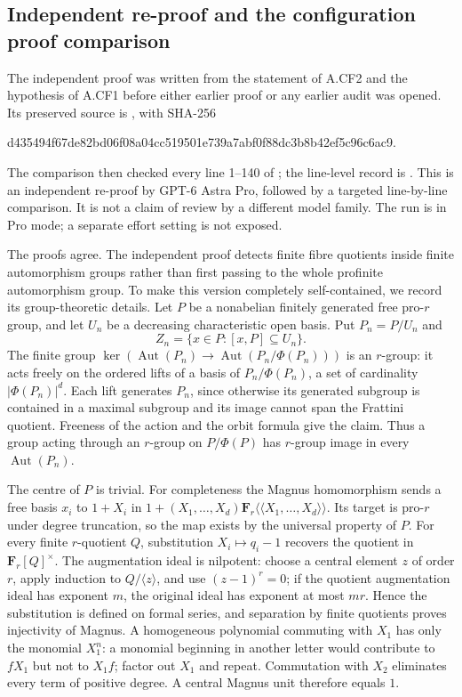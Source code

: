 \subsection{Independent re-proof and the configuration proof comparison}

The independent proof was written from the statement of A.CF2 and the
hypothesis of A.CF1 before either earlier proof or any earlier audit was
opened. Its preserved source is ,
with SHA-256
\begin{center}\footnotesize\ttfamily
d435494f67de82bd06f08a04cc519501e739a7abf0f88dc3b8b42ef5c96c6ac9.
\end{center}
The comparison then checked every line 1--140 of
; the
line-level record is .
This is an independent re-proof by GPT-6 Astra Pro, followed by a
targeted line-by-line comparison. It is not a claim of review by a
different model family. The run is in Pro mode; a separate effort
setting is not exposed.

The proofs agree. The independent proof detects finite fibre quotients
inside finite automorphism groups rather than first passing to the
whole profinite automorphism group. To make this version completely
self-contained, we record its group-theoretic details.
Let $P$ be a nonabelian finitely generated free pro-$r$ group, and let
$U_n$ be a decreasing characteristic open basis. Put $P_n=P/U_n$ and
\[
 Z_n=\{x\in P:[x,P]\subseteq U_n\}.
\]
The finite group
$\ker(\operatorname{Aut}(P_n)\to\operatorname{Aut}(P_n/\Phi(P_n)))$
is an $r$-group: it acts freely on the ordered lifts of a basis of
$P_n/\Phi(P_n)$, a set of cardinality $|\Phi(P_n)|^d$.
Each lift generates $P_n$, since otherwise its generated subgroup is
contained in a maximal subgroup and its image cannot span the
Frattini quotient. Freeness of the action and the orbit formula give
the claim. Thus a group acting through an $r$-group on $P/\Phi(P)$
has $r$-group image in every $\operatorname{Aut}(P_n)$.

The centre of $P$ is trivial. For completeness the Magnus homomorphism
sends a free basis $x_i$ to $1+X_i$ in
$1+(X_1,\ldots,X_d)\mathbf F_r\langle\!\langle X_1,\ldots,X_d\rangle\!\rangle$.
Its target is pro-$r$ under degree truncation, so the map exists by
the universal property of $P$. For every finite $r$-quotient $Q$,
substitution $X_i\mapsto q_i-1$ recovers the quotient in
$\mathbf F_r[Q]^\times$. The augmentation ideal is nilpotent:
choose a central element $z$ of order $r$, apply induction to
$Q/\langle z\rangle$, and use $(z-1)^r=0$; if the quotient
augmentation ideal has exponent $m$, the original ideal has exponent
at most $mr$. Hence the substitution is defined on formal series,
and separation by finite quotients proves injectivity of Magnus.
A homogeneous polynomial commuting with $X_1$ has only the monomial
$X_1^n$: a monomial beginning in another letter would contribute to
$fX_1$ but not to $X_1f$; factor out $X_1$ and repeat.
Commutation with $X_2$ eliminates every term of positive degree.
A central Magnus unit therefore equals $1$.

